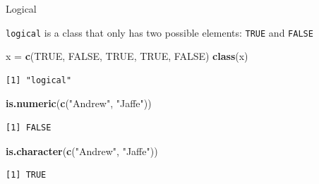 \documentclass[
  ignorenonframetext,
]{beamer}
\newenvironment{Shaded}{\begin{snugshade}}{\end{snugshade}}
\newcommand{\KeywordTok}[1]{\textcolor[rgb]{0.13,0.29,0.53}{\textbf{#1}}}
\newcommand{\NormalTok}[1]{#1}
\newcommand{\OtherTok}[1]{\textcolor[rgb]{0.56,0.35,0.01}{#1}}
\newcommand{\StringTok}[1]{\textcolor[rgb]{0.31,0.60,0.02}{#1}}
\begin{document}
\begin{frame}[fragile]{Logical}
\protect\hypertarget{logical}{}

\texttt{logical} is a class that only has two possible elements:
\texttt{TRUE} and \texttt{FALSE}

\begin{Shaded}
\begin{Highlighting}[]
\NormalTok{x =}\StringTok{ }\KeywordTok{c}\NormalTok{(}\OtherTok{TRUE}\NormalTok{, }\OtherTok{FALSE}\NormalTok{, }\OtherTok{TRUE}\NormalTok{, }\OtherTok{TRUE}\NormalTok{, }\OtherTok{FALSE}\NormalTok{)}
\KeywordTok{class}\NormalTok{(x)}
\end{Highlighting}
\end{Shaded}

\begin{verbatim}
[1] "logical"
\end{verbatim}

\begin{Shaded}
\begin{Highlighting}[]
\KeywordTok{is.numeric}\NormalTok{(}\KeywordTok{c}\NormalTok{(}\StringTok{"Andrew"}\NormalTok{, }\StringTok{"Jaffe"}\NormalTok{))}
\end{Highlighting}
\end{Shaded}

\begin{verbatim}
[1] FALSE
\end{verbatim}

\begin{Shaded}
\begin{Highlighting}[]
\KeywordTok{is.character}\NormalTok{(}\KeywordTok{c}\NormalTok{(}\StringTok{"Andrew"}\NormalTok{, }\StringTok{"Jaffe"}\NormalTok{))}
\end{Highlighting}
\end{Shaded}

\begin{verbatim}
[1] TRUE
\end{verbatim}

\end{frame}
\end{document}
